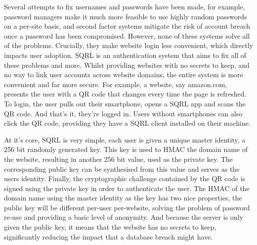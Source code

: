 Several attempts to fix usernames and passwords have been made, for example, password managers make it much more feasible to use highly random passwords on a per-site basis, and second factor systems mitigate the risk of account breach once a password has been compromised. However, none of these systems solve all of the problems. Crucially, they make website login less convenient, which directly impacts user adoption. SQRL is an authentication system that aims to fix all of these problems and more. Whilst providing websites with no secrets to keep, and no way to link user accounts across website domains, the entire system is more convenient and far more secure. For example, a website, say amazon.com, presents the user with a QR code that changes every time the page is refreshed. To login, the user pulls out their smartphone, opens a SQRL app and scans the QR code. And that's it, they're logged in. Users without smartphones can also click the QR code, providing they have a SQRL client installed on their machine.

At it's core, SQRL is very simple, each user is given a unique master identity, a 256 bit randomly generated key. This key is used to HMAC the domain name of the website, resulting in another 256 bit value, used as the private key. The corresponding public key can be synthesised from this value and serves as the users identity. Finally, the cryptographic challenge contained by the QR code is signed using the private key in order to authenticate the user. The HMAC of the domain name using the master identity as the key has two nice properties, the public key will be different per-user per-website, solving the problem of password re-use and providing a basic level of anonymity. And because the server is only given the public key, it means that the website has no secrets to keep, significantly reducing the impact that a database breach might have.
